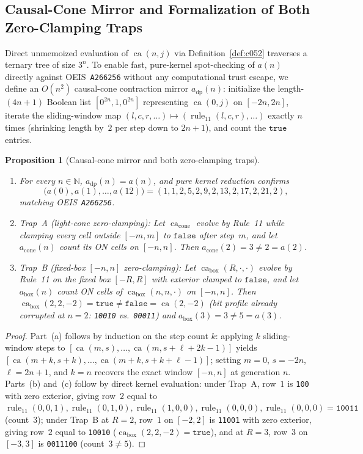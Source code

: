 \documentclass[11pt]{article}
\newtheorem{proposition}[theorem]{Proposition}
\theoremstyle{definition}
\newcommand{\N}{\mathbb{N}}
\newcommand{\seq}[1]{\texttt{#1}}
\newcommand{\ruleTT}{\operatorname{rule}_{11}}
\newcommand{\ca}{\operatorname{ca}}
\begin{document}
\subsection{Causal-Cone Mirror and Formalization of Both Zero-Clamping Traps}

Direct unmemoized evaluation of $\ca(n, j)$ via Definition~\ref{def:c052} traverses a ternary tree of size $3^n$. To enable fast, pure-kernel spot-checking of $a(n)$ directly against OEIS~\seq{A266256} without any computational trust escape, we define an $O(n^2)$ causal-cone contraction mirror $a_{\mathrm{dp}}(n)$: initialize the length-$(4n + 1)$ Boolean list $[0^{2n}, 1, 0^{2n}]$ representing $\ca(0, j)$ on $[-2n, 2n]$, iterate the sliding-window map $(l, c, r, \dots) \mapsto (\ruleTT(l, c, r), \dots)$ exactly $n$ times (shrinking length by~$2$ per step down to $2n + 1$), and count the $\mathtt{true}$ entries.

\begin{proposition}[Causal-cone mirror and both zero-clamping traps]
\label{prop:clamping-traps}
\begin{enumerate}
\item[\textup{(a)}] For every $n \in \N$, $a_{\mathrm{dp}}(n) = a(n)$, and pure kernel reduction confirms
\[
\bigl(a(0), a(1), \dots, a(12)\bigr) = (1, 1, 2, 5, 2, 9, 2, 13, 2, 17, 2, 21, 2),
\]
matching OEIS~\seq{A266256}.
\item[\textup{(b)}] \emph{Trap~A (light-cone zero-clamping):} Let $\ca_{\mathrm{cone}}$ evolve by Rule~11 while clamping every cell outside $[-m, m]$ to $\mathtt{false}$ after step~$m$, and let $a_{\mathrm{cone}}(n)$ count its ON cells on $[-n, n]$. Then $a_{\mathrm{cone}}(2) = 3 \ne 2 = a(2)$.
\item[\textup{(c)}] \emph{Trap~B (fixed-box $[-n, n]$ zero-clamping):} Let $\ca_{\mathrm{box}}(R, \cdot, \cdot)$ evolve by Rule~11 on the fixed box $[-R, R]$ with exterior clamped to $\mathtt{false}$, and let $a_{\mathrm{box}}(n)$ count ON cells of $\ca_{\mathrm{box}}(n, n, \cdot)$ on $[-n, n]$. Then $\ca_{\mathrm{box}}(2, 2, -2) = \mathtt{true} \ne \mathtt{false} = \ca(2, -2)$ (bit profile already corrupted at $n = 2$: \texttt{10010} vs.\ \texttt{00011}) and $a_{\mathrm{box}}(3) = 3 \ne 5 = a(3)$.
\end{enumerate}
\end{proposition}

\begin{proof}
Part~(a) follows by induction on the step count $k$: applying $k$ sliding-window steps to $[\ca(m, s), \dots, \ca(m, s + \ell + 2k - 1)]$ yields $[\ca(m + k, s + k), \dots, \ca(m + k, s + k + \ell - 1)]$; setting $m = 0$, $s = -2n$, $\ell = 2n + 1$, and $k = n$ recovers the exact window $[-n, n]$ at generation $n$. Parts~(b) and~(c) follow by direct kernel evaluation: under Trap~A, row~$1$ is \texttt{100} with zero exterior, giving row~$2$ equal to $\ruleTT(0,0,1), \ruleTT(0,1,0), \ruleTT(1,0,0), \ruleTT(0,0,0), \ruleTT(0,0,0) = \mathtt{10011}$ (count~$3$); under Trap~B at $R = 2$, row~$1$ on $[-2, 2]$ is \texttt{11001} with zero exterior, giving row~$2$ equal to \texttt{10010} ($\ca_{\mathrm{box}}(2, 2, -2) = \mathtt{true}$), and at $R = 3$, row~$3$ on $[-3, 3]$ is \texttt{0011100} (count~$3 \ne 5$).
\end{proof}
\end{document}
